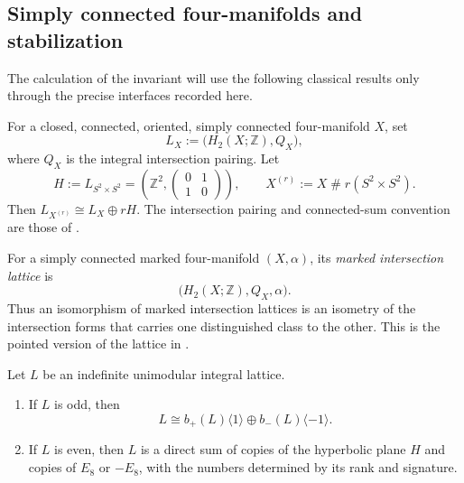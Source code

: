 \subsection{Simply connected four-manifolds and stabilization}
\label{subsec:low-dimensional-topology}

The calculation of the invariant will use the following classical results
only through the precise interfaces recorded here.

\begin{definition}
\label{def:intersection-lattice-stabilization}
For a closed, connected, oriented, simply connected four-manifold $X$, set
\[
  L_X:=\bigl(H_2(X;\mathbb Z),Q_X\bigr),
\]
where $Q_X$ is the integral intersection pairing.  Let
\[
  H:=L_{S^2\times S^2}
   =\left(\mathbb Z^2,
      \begin{pmatrix}0&1\\1&0\end{pmatrix}\right),
  \qquad
  X^{(r)}:=X\mathbin{\#}r(S^2\times S^2).
\]
Then $L_{X^{(r)}}\cong L_X\oplus rH$.
The intersection pairing and connected-sum convention are those of
\cite[Definition~1.2.1 and Section~1.3]{GompfStipsicz1999}.
\end{definition}

\begin{definition}
\label{def:marked-intersection-lattice}
For a simply connected marked four-manifold $(X,\alpha)$, its
\emph{marked intersection lattice} is
\[
  \bigl(H_2(X;\mathbb Z),Q_X,\alpha\bigr).
\]
Thus an isomorphism of marked intersection lattices is an isometry of the
intersection forms that carries one distinguished class to the other.  This
is the pointed version of the lattice in
\cite[Definition~1.2.1]{GompfStipsicz1999}.
\end{definition}

\begin{theorem}
\label{thm:indefinite-unimodular-forms}
Let $L$ be an indefinite unimodular integral lattice.
\begin{enumerate}[label=(\roman*),ref=\roman*]
  \item If $L$ is odd, then
  \[
    L\cong b_+(L)\langle 1\rangle
      \oplus b_-(L)\langle-1\rangle.
  \]
  \item If $L$ is even, then $L$ is a direct sum of copies of the
  hyperbolic plane $H$ and copies of $E_8$ or $-E_8$, with the numbers
  determined by its rank and signature.
\end{enumerate}
\end{theorem}

